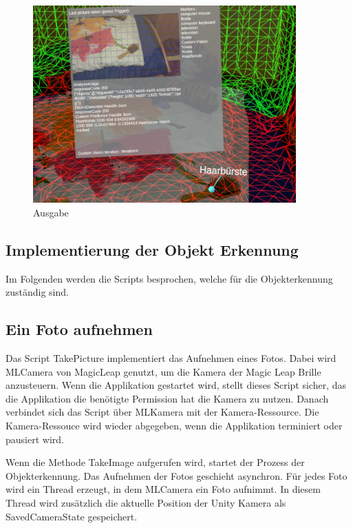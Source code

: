 \begin{figure}[H]
	\centering
	\includegraphics[width=0.9\textwidth]{images/ML_20201004_19.09.17_2.jpg}
	\caption[]{Ausgabe}
	\label{img:ausgabe}
\end{figure}


\subsection{Implementierung der Objekt Erkennung}

Im Folgenden werden die Scripts besprochen, welche für die Objekterkennung zuständig sind.

\subsection{Ein Foto aufnehmen}


Das Script TakePicture implementiert das Aufnehmen eines Fotos. Dabei wird MLCamera von MagicLeap genutzt, um die Kamera der Magic Leap Brille anzusteuern. Wenn die Applikation gestartet wird, stellt dieses Script sicher, das die Applikation die benötigte Permission hat die Kamera zu nutzen. Danach verbindet sich das Script über MLKamera mit der Kamera-Ressource. 
Die Kamera-Ressouce wird wieder abgegeben, wenn die Applikation terminiert oder pausiert wird.

Wenn die Methode TakeImage aufgerufen wird, startet der Prozess der Objekterkennung.
Das Aufnehmen der Fotos geschieht asynchron. Für jedes Foto wird ein Thread erzeugt, in dem MLCamera ein Foto aufnimmt. In diesem Thread wird zusätzlich die aktuelle Position der Unity Kamera als SavedCameraState gespeichert.


